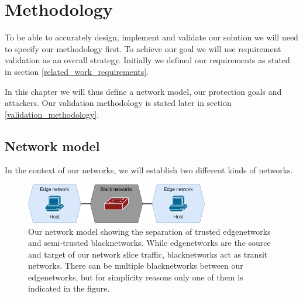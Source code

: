 \chapter{Methodology}
\label{methodology}

To be able to accurately design, implement and validate our solution we will need to specify our methodology first. To achieve our goal we will use requirement validation as an overall strategy. Initially we defined our requirements as stated in section \ref{related_work_requirements}.

In this chapter we will thus define a network model, our protection goals and attackers. Our validation methodology is stated later in section \ref{validation_methodology}.


\section{Network model}
In the context of our networks, we will establish two different kinds of networks.

\begin{figure}[ht]
    \centering
    \includegraphics[width=8cm]{images/chapter_4/network_model.png}
    \caption[Network model]{Our network model showing the separation of trusted \gls{edgenetwork}s and semi-trusted \gls{blacknetwork}s. While \gls{edgenetwork}s are the source and target of our network slice traffic, \gls{blacknetwork}s act as transit networks. There can be multiple \gls{blacknetwork}s between our \gls{edgenetwork}s, but for simplicity reasons only one of them is indicated in the figure.}
    \label{fig:network_model}
\end{figure}

